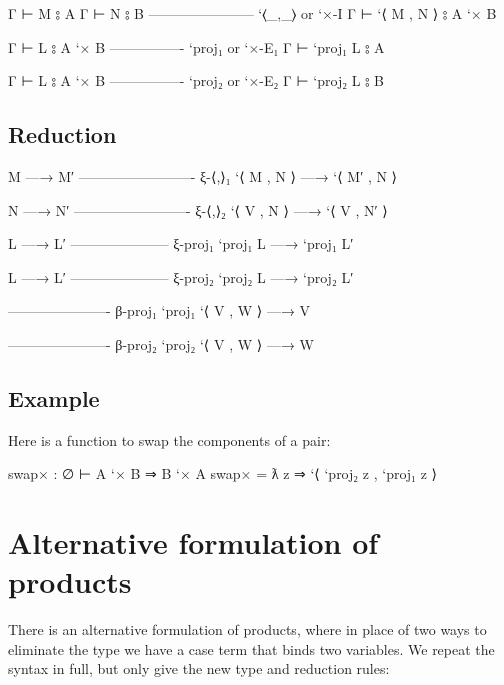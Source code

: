 \begin{myDisplay}
Γ ⊢ M ⦂ A
Γ ⊢ N ⦂ B
----------------------- `⟨_,_⟩ or `×-I
Γ ⊢ `⟨ M , N ⟩ ⦂ A `× B

Γ ⊢ L ⦂ A `× B
---------------- `proj₁ or `×-E₁
Γ ⊢ `proj₁ L ⦂ A

Γ ⊢ L ⦂ A `× B
---------------- `proj₂ or `×-E₂
Γ ⊢ `proj₂ L ⦂ B
\end{myDisplay}

\hypertarget{reduction-2}{%
\subsection{Reduction}\label{reduction-2}}

\begin{myDisplay}
M —→ M′
------------------------- ξ-⟨,⟩₁
`⟨ M , N ⟩ —→ `⟨ M′ , N ⟩

N —→ N′
------------------------- ξ-⟨,⟩₂
`⟨ V , N ⟩ —→ `⟨ V , N′ ⟩

L —→ L′
--------------------- ξ-proj₁
`proj₁ L —→ `proj₁ L′

L —→ L′
--------------------- ξ-proj₂
`proj₂ L —→ `proj₂ L′

---------------------- β-proj₁
`proj₁ `⟨ V , W ⟩ —→ V

---------------------- β-proj₂
`proj₂ `⟨ V , W ⟩ —→ W
\end{myDisplay}

\hypertarget{example-2}{%
\subsection{Example}\label{example-2}}

Here is a function to swap the components of a pair:

\begin{myDisplay}
swap× : ∅ ⊢ A `× B ⇒ B `× A
swap× = ƛ z ⇒ `⟨ `proj₂ z , `proj₁ z ⟩
\end{myDisplay}

\hypertarget{alternative-formulation-of-products}{%
\section{Alternative formulation of
products}\label{alternative-formulation-of-products}}

There is an alternative formulation of products, where in place of two
ways to eliminate the type we have a case term that binds two variables.
We repeat the syntax in full, but only give the new type and reduction
rules:

